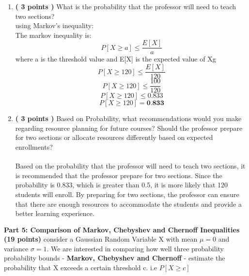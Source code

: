 \documentclass[a3paper,12pt]{extarticle} %
\begin{document}
    \begin{enumerate}
        \item \textbf{( 3 points )} What is the probability that the professor will need to teach two sections?
        \\ using Markov's inequality:
        \\ The markov inequality is:
        \[
        P[X \geq a] \leq \frac{E[X]}{a}
        \]
        where a is the threshold value and E[X] is the expected value of Xg
        \[
        P[X \geq 120] \leq \frac{E[X]}{120}
        \]
        \[
        P[X \geq 120] \leq \frac{100}{120}
        \]
        \[
        P[X \geq 120] \leq 0.833
        \]
        \[
        P[X \geq 120] = \textbf{0.833}
        \]
        \item \textbf{( 3 points )} Based on Probability, what recommendations would you make regarding resource planning for future courses? Should the professor prepare for two sections or allocate resources differently based on expected enrollments?
        \\\\ Based on the probability that the professor will need to teach two sections, it is recommended that the professor prepare for two sections. Since the probability is 0.833, which is greater than 0.5, it is more likely that 120 students will enroll. By preparing for two sections, the professor can ensure that there are enough resources to accommodate the students and provide a better learning experience.
    \end{enumerate}
    \subitem \textbf{Part 5: Comparison of Markov, Chebyshev and Chernoff Inequalities (19 points)}
    consider a Gaussian Random Variable X with mean \(\mu = 0\) and variance \(\sigma = 1\). We are interested in comparing how well three probability probability bounds - \textbf{Markov, Chebyshev and Chernoff} - estimate the probability that X exceeds a certain threshold c. i.e \(P[X \geq c]\)
\end{document}
